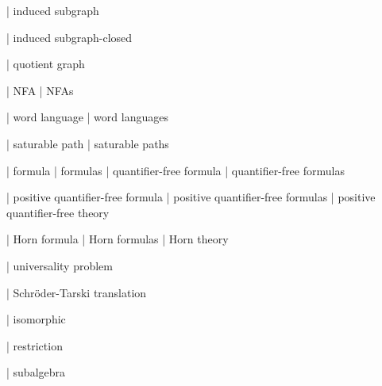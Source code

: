 | induced subgraph

| induced subgraph-closed

| quotient graph


| NFA
| NFAs

| word language
| word languages


| saturable path
| saturable paths


| formula
| formulas
| quantifier-free formula
| quantifier-free formulas

| positive quantifier-free formula
| positive quantifier-free formulas
| positive quantifier-free theory

| Horn formula
| Horn formulas
| Horn theory

| universality problem

| Schr{\"o}der-Tarski translation

| isomorphic

| restriction

| subalgebra
